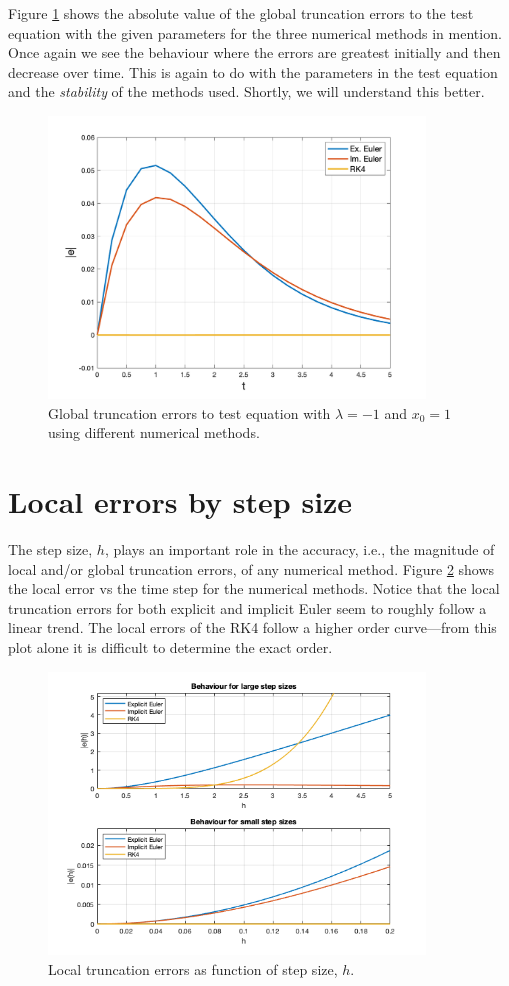 Figure \ref{fig1:global_err1} shows the absolute value of the global truncation errors to the test equation with the given parameters for the three numerical methods in mention. Once again we see the behaviour where the errors are greatest initially and then decrease over time. This is again to do with the parameters in the test equation and the \textit{stability} of the methods used. Shortly, we will understand this better.

\begin{figure}[H]
    \centering
    \includegraphics[width=10cm]{graphics/opg1/global_err1.png}
    \caption{Global truncation errors to test equation with $\lambda=-1$ and $x_0=1$ using different numerical methods.}
    \label{fig1:global_err1}
\end{figure}

\section{Local errors by step size}
The step size, $h$, plays an important role in the accuracy, i.e., the magnitude of local and/or global truncation errors, of any numerical method. Figure \ref{fig1:local_err2} shows the local error vs the time step for the numerical methods. Notice that the local truncation errors for both explicit and implicit Euler seem to roughly follow a linear trend. The local errors of the RK4 follow a higher order curve---from this plot alone it is difficult to determine the exact order.

\begin{figure}[H]
    \centering
    \includegraphics[width=10cm]{graphics/opg1/local_err_h.png}
    \caption{Local truncation errors as function of step size, $h$.}
    \label{fig1:local_err2}
\end{figure}

